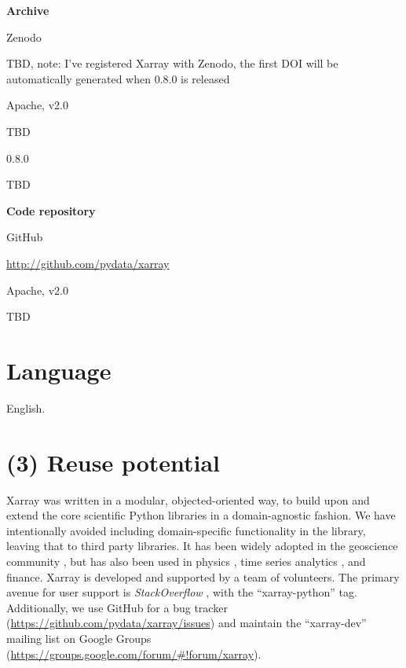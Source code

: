 \documentclass{jors}
\begin{document}
{\bf Archive}

\begin{description}[noitemsep,topsep=0pt]
	\item[Name:] Zenodo
	\item[Persistent identifier:] TBD, note: I've registered Xarray with Zenodo, the first DOI will be automatically generated when 0.8.0 is released
	\item[Licence:] Apache, v2.0
	\item[Publisher:]  TBD
	\item[Version published:] 0.8.0
	\item[Date published:] TBD
\end{description}

{\bf Code repository}

\begin{description}[noitemsep,topsep=0pt]
	\item[Name:] GitHub
	\item[Persistent identifier:] \url{http://github.com/pydata/xarray}
	\item[Licence:] Apache, v2.0
	\item[Date published:] TBD
\end{description}

\section*{Language}

English.

\section*{(3) Reuse potential}

Xarray was written in a modular, objected-oriented way, to build upon and extend the core scientific Python libraries in a domain-agnostic fashion.
We have intentionally avoided including domain-specific functionality in the library, leaving that to third party libraries.
It has been widely adopted in the geoscience community \citep[e.g.][]{Dawson_2016a,Dawson_2016b,xgcm}, but has also been used in physics \citep[e.g.][]{pycalphad}, time series analytics \citep{cesium}, and finance.
Xarray is developed and supported by a team of volunteers. The primary avenue for user support is \textit{StackOverflow} \citep{stackoverflow}, with the ``xarray-python'' tag.
Additionally, we use GitHub for a bug tracker (\url{https://github.com/pydata/xarray/issues}) and maintain the ``xarray-dev'' mailing list on Google Groups (\url{https://groups.google.com/forum/#!forum/xarray}).
\end{document}
